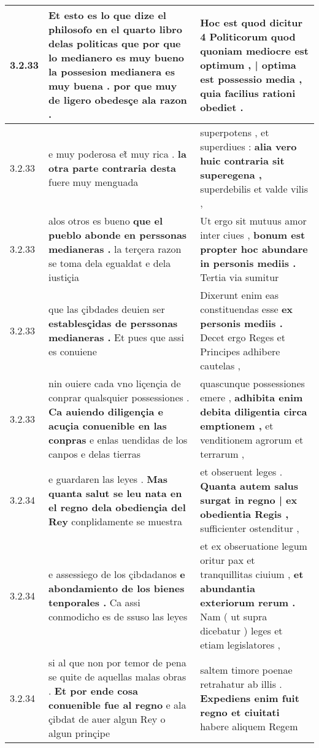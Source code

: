 \begin{tabular}{|p{1cm}|p{6.5cm}|p{6.5cm}|}
3.2.33 & Et esto es lo que dize el philosofo en el quarto libro delas politicas \textbf{ que por que lo medianero es muy bueno la possesion medianera es muy buena . } por que muy de ligero obedesçe ala razon . & Hoc est quod dicitur 4 Politicorum \textbf{ quod quoniam mediocre est optimum , | optima est possessio media , } quia facilius rationi obediet . \\\hline
3.2.33 & e muy poderosa et̃ muy rica . \textbf{ la otra parte contraria desta } fuere muy menguada & superpotens , et superdiues : \textbf{ alia vero huic contraria sit superegena , } superdebilis et valde vilis , \\\hline
3.2.33 & alos otros es bueno \textbf{ que el pueblo abonde en perssonas medianeras . } la terçera razon se toma dela egualdat e dela iustiçia & Ut ergo sit mutuus amor inter ciues , \textbf{ bonum est propter hoc abundare in personis mediis . } Tertia via sumitur \\\hline
3.2.33 & que las çibdades deuien ser \textbf{ establesçidas de perssonas medianeras . } Et pues que assi es conuiene & Dixerunt enim eas constituendas esse \textbf{ ex personis mediis . } Decet ergo Reges et Principes adhibere cautelas , \\\hline
3.2.33 & nin ouiere cada vno liçençia de conprar qualsquier possessiones . \textbf{ Ca auiendo diligençia e acuçia conuenible en las conpras } e enlas uendidas de los canpos e delas tierras & quascunque possessiones emere , \textbf{ adhibita enim debita diligentia circa emptionem , } et venditionem agrorum et terrarum , \\\hline
3.2.34 & e guardaren las leyes . \textbf{ Mas quanta salut se leu nata en el regno dela obediençia del Rey } conplidamente se muestra & et obseruent leges . \textbf{ Quanta autem salus surgat in regno | ex obedientia Regis , } sufficienter ostenditur , \\\hline
3.2.34 & e assessiego de los çibdadanos \textbf{ e abondamiento de los bienes tenporales . } Ca assi conmodicho es de ssuso las leyes & et ex obseruatione legum oritur pax et tranquillitas ciuium , \textbf{ et abundantia exteriorum rerum . } Nam ( ut supra dicebatur ) leges et etiam legislatores , \\\hline
3.2.34 & si al que non por temor de pena se quite de aquellas malas obras . \textbf{ Et por ende cosa conuenible fue al regno } e ala çibdat de auer algun Rey o algun prinçipe & saltem timore poenae retrahatur ab illis . \textbf{ Expediens enim fuit regno et ciuitati } habere aliquem Regem \\\hline

\end{tabular}
